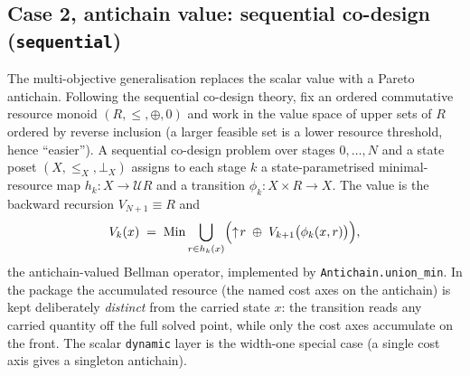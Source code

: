 \documentclass[11pt,a4paper]{article}
\begin{document}
\subsection{Case 2, antichain value: sequential co-design (\texttt{sequential})}
\label{sec:sequential}

The multi-objective generalisation replaces the scalar value with a Pareto
antichain. Following the sequential co-design theory, fix an ordered
commutative resource monoid $(R, \le, \oplus, 0)$ and work in the value
space of upper sets of $R$ ordered by reverse inclusion (a larger feasible
set is a lower resource threshold, hence ``easier''). A sequential
co-design problem over stages $0,\dots,N$ and a state poset
$(X, \le_X, \bot_X)$ assigns to each stage $k$ a state-parametrised
minimal-resource map $h_k : X \to \mathcal{U}R$ and a transition
$\phi_k : X \times R \to X$. The value is the backward recursion
$V_{N+1} \equiv R$ and
\[
  V_k(x) \;=\; \mathrm{Min} \bigcup_{r \in h_k(x)}
      \Bigl( \uparrow\! r \;\oplus\; V_{k+1}\bigl(\phi_k(x, r)\bigr) \Bigr),
\]
the antichain-valued Bellman operator, implemented by
\texttt{Antichain.union\_min}. In the package the accumulated resource
(the named cost axes on the antichain) is kept deliberately \emph{distinct}
from the carried state $x$: the transition reads any carried quantity off
the full solved point, while only the cost axes accumulate on the front.
The scalar \texttt{dynamic} layer is the width-one special case (a single
cost axis gives a singleton antichain).
\end{document}
